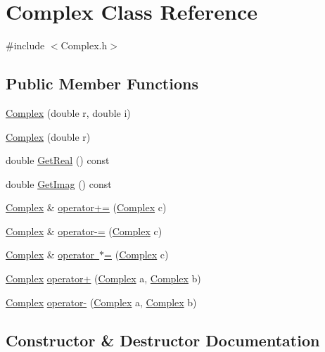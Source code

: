 \hypertarget{class_complex}{}\section{Complex Class Reference}
\label{class_complex}


{\ttfamily \#include $<$Complex.\+h$>$}

\subsection*{Public Member Functions}
\begin{DoxyCompactItemize}
\item 
\mbox{\hyperlink{class_complex_af56593c9b976452fd1480c1cc9e7a8c7}{Complex}} (double r, double i)
\item 
\mbox{\hyperlink{class_complex_a5ef29d91cbdfe6710c052f23c90d260d}{Complex}} (double r)
\item 
double \mbox{\hyperlink{class_complex_adaca4ef2fbe97addb3654c94bd8a8438}{Get\+Real}} () const
\item 
double \mbox{\hyperlink{class_complex_a9e7ef2ffabdac1acfe0f0efc0d58c247}{Get\+Imag}} () const
\item 
\mbox{\hyperlink{class_complex}{Complex}} \& \mbox{\hyperlink{class_complex_a56c23d43b54279ea82e5c66df7b418d2}{operator+=}} (\mbox{\hyperlink{class_complex}{Complex}} c)
\item 
\mbox{\hyperlink{class_complex}{Complex}} \& \mbox{\hyperlink{class_complex_a84206afd7fc3f2b88e21b20d259146f6}{operator-\/=}} (\mbox{\hyperlink{class_complex}{Complex}} c)
\item 
\mbox{\hyperlink{class_complex}{Complex}} \& \mbox{\hyperlink{class_complex_aece50b1266b3f13c161fe9ff335c10e5}{operator $\ast$=}} (\mbox{\hyperlink{class_complex}{Complex}} c)
\item 
\mbox{\hyperlink{class_complex}{Complex}} \mbox{\hyperlink{class_complex_aec00ed797b4e317862c3c42a3cc42c77}{operator+}} (\mbox{\hyperlink{class_complex}{Complex}} a, \mbox{\hyperlink{class_complex}{Complex}} b)
\item 
\mbox{\hyperlink{class_complex}{Complex}} \mbox{\hyperlink{class_complex_a772894d45f888a5b57c994b03d5e6926}{operator-\/}} (\mbox{\hyperlink{class_complex}{Complex}} a, \mbox{\hyperlink{class_complex}{Complex}} b)
\end{DoxyCompactItemize}


\subsection{Constructor \& Destructor Documentation}
\mbox{\label{class_complex_af56593c9b976452fd1480c1cc9e7a8c7}} 
